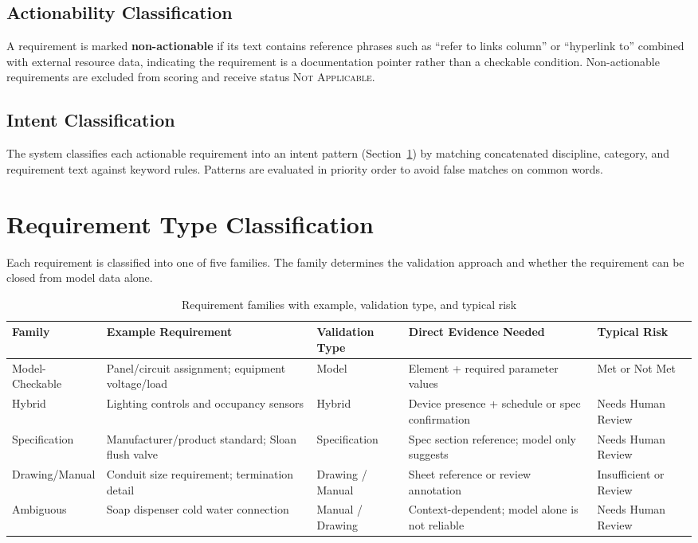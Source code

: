 \documentclass[10pt,letterpaper]{article}
\begin{document}
\subsection{Actionability Classification}

A requirement is marked \textbf{non-actionable} if its text contains reference phrases such as
``refer to links column'' or ``hyperlink to'' combined with external resource data, indicating the
requirement is a documentation pointer rather than a checkable condition. Non-actionable
requirements are excluded from scoring and receive status \textsc{Not Applicable}.

\subsection{Intent Classification}

The system classifies each actionable requirement into an intent pattern
(Section~\ref{sec:requirement-types}) by matching concatenated discipline, category, and
requirement text against keyword rules. Patterns are evaluated in priority order to avoid false
matches on common words.

\section{Requirement Type Classification}
\label{sec:requirement-types}

Each requirement is classified into one of five families. The family determines the validation
approach and whether the requirement can be closed from model data alone.

\begin{longtable}{p{1.1in}p{1.4in}p{1.1in}p{1.4in}p{1.1in}}
\caption{Requirement families with example, validation type, and typical risk}
\label{tab:req-families}\\
\toprule
\textbf{Family} & \textbf{Example Requirement} & \textbf{Validation Type} & \textbf{Direct Evidence Needed} & \textbf{Typical Risk} \\
\midrule
\endhead
Model-Checkable & Panel/circuit assignment; equipment voltage/load & Model & Element +
  required parameter values & Met or Not Met \\
Hybrid & Lighting controls and occupancy sensors & Hybrid & Device presence +
  schedule or spec confirmation & Needs Human Review \\
Specification & Manufacturer/product standard; Sloan flush valve & Specification & Spec
  section reference; model only suggests & Needs Human Review \\
Drawing/Manual & Conduit size requirement; termination detail & Drawing / Manual & Sheet
  reference or review annotation & Insufficient or Review \\
Ambiguous & Soap dispenser cold water connection & Manual / Drawing & Context-dependent;
  model alone is not reliable & Needs Human Review \\
\bottomrule
\end{longtable}
\end{document}
